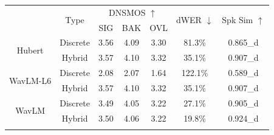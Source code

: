 \documentclass[conference]{IEEEtran}
\begin{document}
\begin{table}
    \setlength{\tabcolsep}{4pt} %
    \renewcommand{\arraystretch}{1.2}
    \begin{center}
        \begin{tabular}{ccccccc}
            \Xhline{2\arrayrulewidth} %
            \multirow{2}{*}{SSL-Model} & \multirow{2}{*}{Type} & \multicolumn{3}{c}{ DNSMOS $\uparrow$} & \multirow{2}{*}{dWER $\downarrow$} & \multirow{2}{*}{Spk Sim $\uparrow$} \\
            \cline{3-5}
                                                       &                             & SIG     & BAK     & OVL    &                       &                          \\ 
            \hline
            \multirow{2}{*}{Hubert}                              &  Discrete                          & 3.56    & 4.09    & 3.30   & 81.3\%                & 0.865\_d                        \\
                                             &  Hybrid                          & 3.57    & 4.10    & 3.32   & 35.1\%                & 0.907\_d                        \\
            \hline
            \multirow{2}{*}{WavLM-L6}                              &  Discrete                          & 2.08    & 2.07    & 1.64   & 122.1\%                & 0.589\_d                        \\
            &  Hybrid                          & 3.57    & 4.10    & 3.32   & 35.1\%                & 0.907\_d                        \\
            \hline
            \hline
            \multirow{2}{*}{WavLM}                                     &  Discrete                          & 3.49    & 4.05    & 3.22   & 27.1\%                & 0.905\_d                        \\
                                              &  Hybrid                          & 3.50    & 4.06    & 3.22   & 19.8\%                & 0.924\_d                        \\
            
            \Xhline{2\arrayrulewidth} %
            \end{tabular}
            \linebreak
            \label{main_exp}
      \end{center}
  \end{table}
\end{document}
